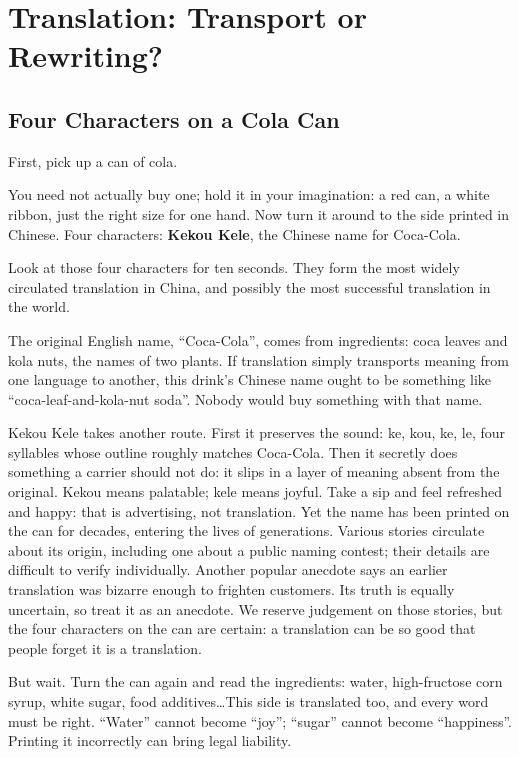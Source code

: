 \chapter{Translation: Transport or Rewriting?}
\section{Four Characters on a Cola Can}
First, pick up a can of cola.

You need not actually buy one; hold it in your imagination: a red can, a white ribbon, just the right size for one hand. Now turn it around to the side printed in Chinese. Four characters: \textbf{Kekou Kele}, the Chinese name for Coca-Cola.

Look at those four characters for ten seconds. They form the most widely circulated translation in China, and possibly the most successful translation in the world.

The original English name, ``Coca-Cola'', comes from ingredients: coca leaves and kola nuts, the names of two plants. If translation simply transports meaning from one language to another, this drink's Chinese name ought to be something like ``coca-leaf-and-kola-nut soda''. Nobody would buy something with that name.

Kekou Kele takes another route. First it preserves the sound: ke, kou, ke, le, four syllables whose outline roughly matches Coca-Cola. Then it secretly does something a carrier should not do: it slips in a layer of meaning absent from the original. Kekou means palatable; kele means joyful. Take a sip and feel refreshed and happy: that is advertising, not translation. Yet the name has been printed on the can for decades, entering the lives of generations. Various stories circulate about its origin, including one about a public naming contest; their details are difficult to verify individually. Another popular anecdote says an earlier translation was bizarre enough to frighten customers. Its truth is equally uncertain, so treat it as an anecdote. We reserve judgement on those stories, but the four characters on the can are certain: a translation can be so good that people forget it is a translation.

But wait. Turn the can again and read the ingredients: water, high-fructose corn syrup, white sugar, food additives\ldots This side is translated too, and every word must be right. ``Water'' cannot become ``joy''; ``sugar'' cannot become ``happiness''. Printing it incorrectly can bring legal liability.

